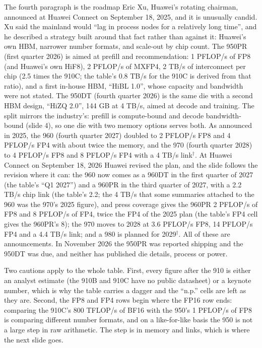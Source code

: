 \documentclass[11pt,letterpaper]{article}
\begin{document}
The fourth paragraph is the roadmap Eric Xu, Huawei's rotating chairman, announced at Huawei Connect on September 18, 2025, and it is unusually candid. Xu said the mainland would ``lag in process nodes for a relatively long time'', and he described a strategy built around that fact rather than against it: Huawei's own HBM, narrower number formats, and scale-out by chip count. The 950PR (first quarter 2026) is aimed at prefill and recommendation: 1 PFLOP/s of FP8 (and Huawei's own HiF8), 2 PFLOP/s of MXFP4, 2 TB/s of interconnect per chip (2.5 times the 910C; the table's 0.8 TB/s for the 910C is derived from that ratio), and a first in-house HBM, ``HiBL 1.0'', whose capacity and bandwidth were not stated. The 950DT (fourth quarter 2026) is the same die with a second HBM design, ``HiZQ 2.0'', 144 GB at 4 TB/s, aimed at decode and training. The split mirrors the industry's: prefill is compute-bound and decode bandwidth-bound (slide 4), so one die with two memory options serves both. As announced in 2025, the 960 (fourth quarter 2027) doubled to 2 PFLOP/s FP8 and 4 PFLOP/s FP4 with about twice the memory, and the 970 (fourth quarter 2028) to 4 PFLOP/s FP8 and 8 PFLOP/s FP4 with a 4 TB/s link$^\dagger$. At Huawei Connect on September 18, 2026 Huawei revised the plan, and the slide follows the revision where it can: the 960 now comes as a 960DT in the first quarter of 2027 (the table's ``Q1 2027'') and a 960PR in the third quarter of 2027, with a 2.2 TB/s chip link (the table's 2.2; the 4 TB/s that some summaries attached to the 960 was the 970's 2025 figure), and press coverage gives the 960PR 2 PFLOP/s of FP8 and 8 PFLOP/s of FP4, twice the FP4 of the 2025 plan (the table's FP4 cell gives the 960PR's 8); the 970 moves to 2028 at 3.6 PFLOP/s FP8, 14 PFLOP/s FP4 and a 4.4 TB/s link; and a 980 is planned for 2029$^\dagger$. All of these are announcements. In November 2026 the 950PR was reported shipping and the 950DT was due, and neither has published die details, process or power.

Two cautions apply to the whole table. First, every figure after the 910 is either an analyst estimate (the 910B and 910C have no public datasheet) or a keynote number, which is why the table carries a dagger and the ``n.p.'' cells are left as they are. Second, the FP8 and FP4 rows begin where the FP16 row ends: comparing the 910C's 800 TFLOP/s of BF16 with the 950's 1 PFLOP/s of FP8 is comparing different number formats, and on a like-for-like basis the 950 is not a large step in raw arithmetic. The step is in memory and links, which is where the next slide goes.
\end{document}
